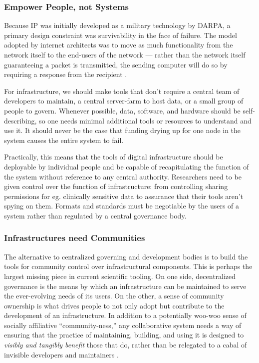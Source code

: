 \documentclass[10pt]{article}
\begin{document}
\begin{multicols}{2}
\hypertarget{empower-people-not-systems}{%
\subsubsection{Empower People, not
Systems}\label{empower-people-not-systems}}

Because IP was initially developed as a military technology by DARPA, a
primary design constraint was survivability in the face of failure. The
model adopted by internet architects was to move as much functionality
from the network itself to the end-users of the network --- rather than
the network itself guaranteeing a packet is transmitted, the sending
computer will do so by requiring a response from the recipient \cite{clarkDesignPhilosophyDARPA1988} .

For infrastructure, we should make tools that don't require a central
team of developers to maintain, a central server-farm to host data, or a
small group of people to govern. Whenever possible, data, software, and
hardware should be self-describing, so one needs minimal additional
tools or resources to understand and use it. It should never be the case
that funding drying up for one node in the system causes the entire
system to fail.

Practically, this means that the tools of digital infrastructure should
be deployable by individual people and be capable of recapitulating the
function of the system without reference to any central authority.
Researchers need to be given control over the function of
infrastructure: from controlling sharing permissions for eg. clinically
sensitive data to assurance that their tools aren't spying on them.
Formats and standards must be negotiable by the users of a system rather
than regulated by a central governance body.

\hypertarget{infrastructures-need-communities}{%
\subsubsection{Infrastructures need
Communities}\label{infrastructures-need-communities}}

The alternative to centralized governing and development bodies is to
build the tools for community control over infrastructural components.
This is perhaps the largest missing piece in current scientific tooling.
On one side, decentralized governance is the means by which an
infrastructure can be maintained to serve the ever-evolving needs of its
users. On the other, a sense of community ownership is what drives
people to not only adopt but contribute to the development of an
infrastructure. In addition to a potentially woo-woo sense of socially
affiliative ``community-ness,'' any collaborative system needs a way of
ensuring that the practice of maintaining, building, and using it is
designed to \emph{visibly and tangibly benefit} those that do, rather
than be relegated to a cabal of invisible developers and maintainers
\cite{grudinGroupwareSocialDynamics1994, randallDistributedOntologyBuilding2011} .


\end{multicols}
\end{document}
